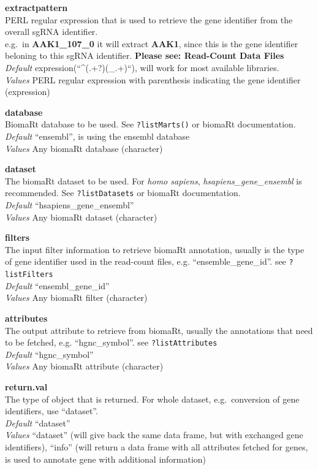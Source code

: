 \documentclass[]{article}
\begin{document}
\textbf{extractpattern}\\
PERL regular expression that is used to retrieve the gene identifier
from the overall sgRNA identifier.\\
e.g.~in \textbf{AAK1\_107\_0} it will extract \textbf{AAK1}, since this
is the gene identifier beloning to this sgRNA identifier. \textbf{Please
see: Read-Count Data Files}\\
\emph{Default} expression(``\^{}(.+?)(\_.+)``), will work for most
available libraries.\\
\emph{Values} PERL regular expression with parenthesis indicating the
gene identifier (expression)

\textbf{database}\\
BiomaRt database to be used. See \texttt{?listMarts()} or biomaRt
documentation.\\
\emph{Default} ``ensembl'', is using the ensembl database\\
\emph{Values} Any biomaRt database (character)

\textbf{dataset}\\
The biomaRt dataset to be used. For \emph{homo sapiens},
\emph{hsapiens\_gene\_ensembl} is recommended. See
\texttt{?listDatasets} or biomaRt documentation.\\
\emph{Default} ``hsapiens\_gene\_ensembl''\\
\emph{Values} Any biomaRt dataset (character)

\textbf{filters}\\
The input filter information to retrieve biomaRt annotation, usually is
the type of gene identifier used in the read-count files, e.g.
``ensemble\_gene\_id''. see \texttt{?listFilters}\\
\emph{Default} ``ensembl\_gene\_id''\\
\emph{Values} Any biomaRt filter (character)

\textbf{attributes}\\
The output attribute to retrieve from biomaRt, usually the annotations
that need to be fetched, e.g. ``hgnc\_symbol''. see
\texttt{?listAttributes}\\
\emph{Default} ``hgnc\_symbol''\\
\emph{Values} Any biomaRt attribute (character)

\textbf{return.val}\\
The type of object that is returned. For whole dataset, e.g.~conversion
of gene identifiers, use ``dataset''.\\
\emph{Default} ``dataset''\\
\emph{Values} ``dataset'' (will give back the same data frame, but with
exchanged gene identifiers), ``info'' (will return a data frame with all
attributes fetched for genes, is used to annotate gene with additional
information)
\end{document}
